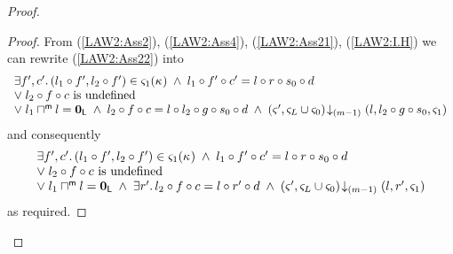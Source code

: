 \begin{lemma}[]
\begin{proof}
\begin{proof}
From (\ref{LAW2:Ass2}), (\ref{LAW2:Ass4}), (\ref{LAW2:Ass21}), (\ref{LAW2:I.H}) we can rewrite (\ref{LAW2:Ass22}) into
%
\begin{align}
	\begin{array}{l}
  	\exists f', c'.\, (l_1 \circ f', l_2 \circ f') \in \varsigma_{1}(\kappa_{}) \;\land\; l_1 \circ f' \circ c' =  l \circ r \circ s_0 \circ d\\
		\lor\;l_2 \circ f \circ c \text{ is undefined}\\
		\lor\; l_1 \sqcap_{}^{\textsf{m}} l = \mathbf{0}_{\textsf{L}} \;\land\; l_2 \circ f \circ c = l \circ l_2 \circ g \circ s_0 \circ d \;\land\; \left(\varsigma_{}', \varsigma_{L} \cup \varsigma_{0}\right) \!\downarrow_{(m-1)} \left(l, l_2 \circ g \circ s_0, \varsigma_{1}\right)
	\end{array} \label{LAW2:Ass22}
\end{align}
and consequently 
%
\begin{align}
	\begin{array}{l}
  	\exists f', c'.\, (l_1 \circ f', l_2 \circ f') \in \varsigma_{1}(\kappa_{}) \;\land\; l_1 \circ f' \circ c' =  l \circ r \circ s_0 \circ d\\
		\lor\;l_2 \circ f \circ c \text{ is undefined}\\
		\lor\; l_1 \sqcap_{}^{\textsf{m}} l = \mathbf{0}_{\textsf{L}} \;\land\; \exists r'.\, l_2 \circ f \circ c = l \circ r' \circ d \;\land\; \left(\varsigma_{}', \varsigma_{L} \cup \varsigma_{0}\right) \!\downarrow_{(m-1)} \left(l, r', \varsigma_{1}\right)
	\end{array} \label{LAW2:Ass22}
\end{align}
as required.
\renewcommand{\qed}{}
\end{proof}



\end{proof}
\end{lemma}
